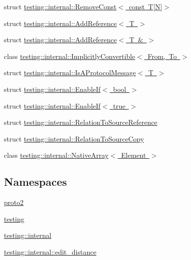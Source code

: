 \begin{DoxyCompactItemize}
\item 
struct \mbox{\hyperlink{structtesting_1_1internal_1_1_remove_const_3_01const_01_t[_n]_4}{testing\+::internal\+::\+Remove\+Const$<$ const T\mbox{[}\+N\mbox{]}$>$}}
\item 
struct \mbox{\hyperlink{structtesting_1_1internal_1_1_add_reference}{testing\+::internal\+::\+Add\+Reference$<$ T $>$}}
\item 
struct \mbox{\hyperlink{structtesting_1_1internal_1_1_add_reference_3_01_t_01_6_01_4}{testing\+::internal\+::\+Add\+Reference$<$ T \& $>$}}
\item 
class \mbox{\hyperlink{classtesting_1_1internal_1_1_implicitly_convertible}{testing\+::internal\+::\+Implicitly\+Convertible$<$ From, To $>$}}
\item 
struct \mbox{\hyperlink{structtesting_1_1internal_1_1_is_a_protocol_message}{testing\+::internal\+::\+Is\+A\+Protocol\+Message$<$ T $>$}}
\item 
struct \mbox{\hyperlink{structtesting_1_1internal_1_1_enable_if}{testing\+::internal\+::\+Enable\+If$<$ bool $>$}}
\item 
struct \mbox{\hyperlink{structtesting_1_1internal_1_1_enable_if_3_01true_01_4}{testing\+::internal\+::\+Enable\+If$<$ true $>$}}
\item 
struct \mbox{\hyperlink{structtesting_1_1internal_1_1_relation_to_source_reference}{testing\+::internal\+::\+Relation\+To\+Source\+Reference}}
\item 
struct \mbox{\hyperlink{structtesting_1_1internal_1_1_relation_to_source_copy}{testing\+::internal\+::\+Relation\+To\+Source\+Copy}}
\item 
class \mbox{\hyperlink{classtesting_1_1internal_1_1_native_array}{testing\+::internal\+::\+Native\+Array$<$ Element $>$}}
\end{DoxyCompactItemize}
\subsection*{Namespaces}
\begin{DoxyCompactItemize}
\item 
 \mbox{\hyperlink{namespaceproto2}{proto2}}
\item 
 \mbox{\hyperlink{namespacetesting}{testing}}
\item 
 \mbox{\hyperlink{namespacetesting_1_1internal}{testing\+::internal}}
\item 
 \mbox{\hyperlink{namespacetesting_1_1internal_1_1edit__distance}{testing\+::internal\+::edit\+\_\+distance}}
\end{DoxyCompactItemize}
